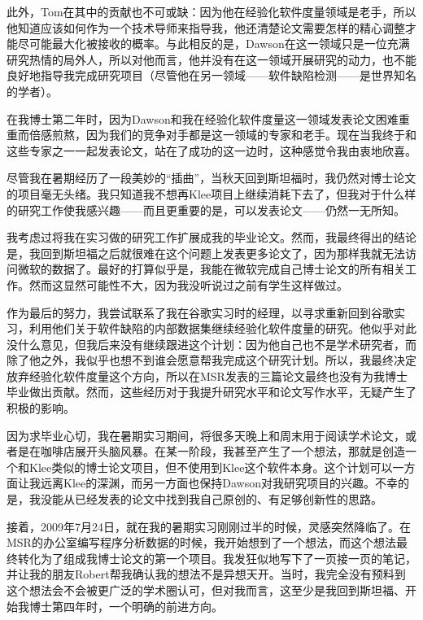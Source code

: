 \documentclass[letter,12pt]{book}
\begin{document}
\begin{CJK}{UTF8}{gbsn}
此外，Tom在其中的贡献也不可或缺：因为他在经验化软件度量领域是老手，所以他知道应该如何作为一个技术导师来指导我，他还清楚论文需要怎样的精心调整才能尽可能最大化被接收的概率。与此相反的是，Dawson在这一领域只是一位充满研究热情的局外人，所以对他而言，他并没有在这一领域开展研究的动力，也不能良好地指导我完成研究项目（尽管他在另一领域——软件缺陷检测——是世界知名的学者）。

在我博士第二年时，因为Dawson和我在经验化软件度量这一领域发表论文困难重重而倍感煎熬，因为我们的竞争对手都是这一领域的专家和老手。现在当我终于和这些专家之一一起发表论文，站在了成功的这一边时，这种感觉令我由衷地欣喜。

\breakline

尽管我在暑期经历了一段美妙的“插曲”，当秋天回到斯坦福时，我仍然对博士论文的项目毫无头绪。我只知道我不想再Klee项目上继续消耗下去了，但我对于什么样的研究工作使我感兴趣——而且更重要的是，可以发表论文——仍然一无所知。

我考虑过将我在实习做的研究工作扩展成我的毕业论文。然而，我最终得出的结论是，我回到斯坦福之后就很难在这个问题上发表更多论文了，因为那样我就无法访问微软的数据了。最好的打算似乎是，我能在微软完成自己博士论文的所有相关工作。然而这显然可能性不大，因为我没听说过之前有学生这样做过。

作为最后的努力，我尝试联系了我在谷歌实习时的经理，以寻求重新回到谷歌实习，利用他们关于软件缺陷的内部数据集继续经验化软件度量的研究。他似乎对此没什么意见，但我后来没有继续跟进这个计划：因为他自己也不是学术研究者，而除了他之外，我似乎也想不到谁会愿意帮我完成这个研究计划。所以，我最终决定放弃经验化软件度量这个方向，所以在MSR发表的三篇论文最终也没有为我博士毕业做出贡献。然而，这些经历对于我提升研究水平和论文写作水平，无疑产生了积极的影响。

因为求毕业心切，我在暑期实习期间，将很多天晚上和周末用于阅读学术论文，或者是在咖啡店展开头脑风暴。在某一阶段，我甚至产生了一个想法，那就是创造一个和Klee类似的博士论文项目，但不使用到Klee这个软件本身。这个计划可以一方面让我远离Klee的深渊，而另一方面也保持Dawson对我研究项目的兴趣。不幸的是，我没能从已经发表的论文中找到我自己原创的、有足够创新性的思路。

接着，2009年7月24日，就在我的暑期实习刚刚过半的时候，灵感突然降临了。在MSR的办公室编写程序分析数据的时候，我开始想到了一个想法，而这个想法最终转化为了组成我博士论文的第一个项目。我发狂似地写下了一页接一页的笔记，并让我的朋友Robert帮我确认我的想法不是异想天开。当时，我完全没有预料到这个想法会不会被更广泛的学术圈认可，但对我而言，这至少是我回到斯坦福、开始我博士第四年时，一个明确的前进方向。



\end{CJK}
\end{document}

